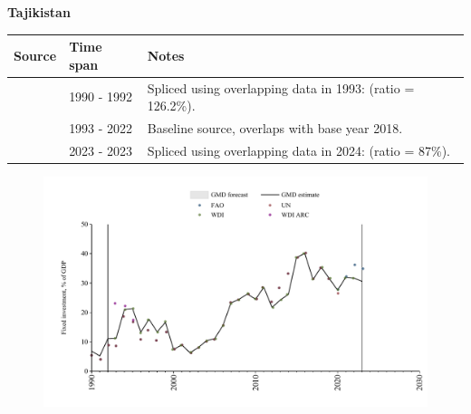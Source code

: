 \documentclass[12pt,a4paper,landscape]{article}
\begin{document}
\begin{adjustbox}{max totalsize={\paperwidth}{\paperheight},center}
\begin{minipage}[t][\textheight][t]{\textwidth}
\vspace*{0.5cm}
{}
\begin{center}
{\Large\bfseries Tajikistan}
\end{center}
\vspace{0.5cm}
\begin{table}[H]
\centering
\small
\begin{tabular}{|l|l|l|}
\hline
\textbf{Source} & \textbf{Time span} & \textbf{Notes} \\
\hline
\rowcolor{white}\cite{UN}& 1990 - 1992 &Spliced using overlapping data in 1993: (ratio = 126.2\%).\\
\rowcolor{lightgray}\cite{WDI}& 1993 - 2022 &Baseline source, overlaps with base year 2018.\\
\rowcolor{white}\cite{FAO}& 2023 - 2023 &Spliced using overlapping data in 2024: (ratio = 87\%).\\
\hline
\end{tabular}
\end{table}
\begin{figure}[H]
\centering
\includegraphics[width=\textwidth,height=0.6\textheight,keepaspectratio]{graphs/TJK_finv_GDP.pdf}
\end{figure}
\end{minipage}
\end{adjustbox}
\end{document}
